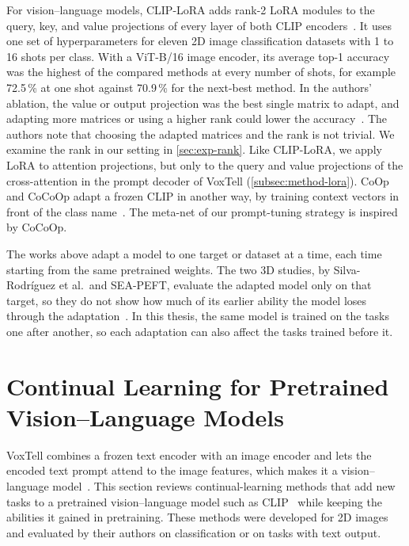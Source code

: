 For vision--language models, CLIP-LoRA adds rank-2 LoRA modules to the query, key, and value projections of every layer of both CLIP encoders~\cite{zanella2024lowrankfewshotadaptationvisionlanguage}.
It uses one set of hyperparameters for eleven 2D image classification datasets with 1 to 16 shots per class.
With a ViT-B/16 image encoder, its average top-1 accuracy was the highest of the compared methods at every number of shots, for example 72.5\,\% at one shot against 70.9\,\% for the next-best method.
In the authors' ablation, the value or output projection was the best single matrix to adapt, and adapting more matrices or using a higher rank could lower the accuracy~\cite[Sec.~6, Fig.~3]{zanella2024lowrankfewshotadaptationvisionlanguage}.
The authors note that choosing the adapted matrices and the rank is not trivial.
We examine the rank in our setting in \cref{sec:exp-rank}.
Like CLIP-LoRA, we apply LoRA to attention projections, but only to the query and value projections of the cross-attention in the prompt decoder of VoxTell (\cref{subsec:method-lora}).
CoOp and CoCoOp adapt a frozen CLIP in another way, by training context vectors in front of the class name~\cite{zhou2022coop,zhou2022cocoop}.
The meta-net of our prompt-tuning strategy is inspired by CoCoOp.

The works above adapt a model to one target or dataset at a time, each time starting from the same pretrained weights.
The two 3D studies, by Silva-Rodríguez et al.\ and SEA-PEFT, evaluate the adapted model only on that target, so they do not show how much of its earlier ability the model loses through the adaptation~\cite{silvarodriguez2023fseft,ly2026seapeft}.
In this thesis, the same model is trained on the tasks one after another, so each adaptation can also affect the tasks trained before it.

\section[Continual Learning for Pretrained Vision--Language Models]{Continual Learning for Pretrained\texorpdfstring{\newline}{ } Vision--Language Models}
\label{sec:cl-vlm}

VoxTell combines a frozen text encoder with an image encoder and lets the encoded text prompt attend to the image features, which makes it a vision--language model~\cite[Sec.~3]{rokuss2025voxtellfreetextpromptableuniversal}.
This section reviews continual-learning methods that add new tasks to a pretrained vision--language model such as CLIP~\cite{radford2021learningtransferablevisualmodels} while keeping the abilities it gained in pretraining.
These methods were developed for 2D images and evaluated by their authors on classification or on tasks with text output.

